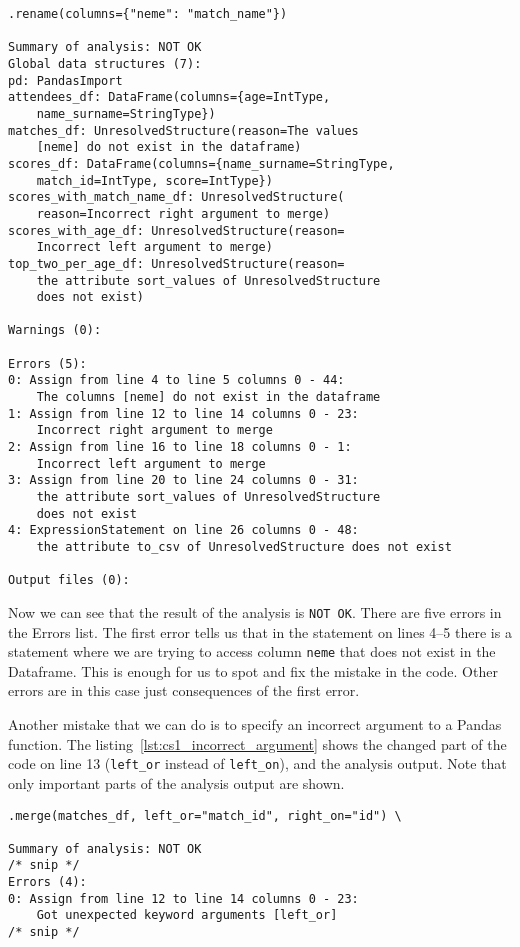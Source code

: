 \begin{lstlisting}[caption=Misspelled column on rename function and analysis output, label={lst:cs1_misspelled_column}, captionpos=b]
    .rename(columns={"neme": "match_name"})

Summary of analysis: NOT OK
Global data structures (7):
pd: PandasImport
attendees_df: DataFrame(columns={age=IntType,
    name_surname=StringType})
matches_df: UnresolvedStructure(reason=The values
    [neme] do not exist in the dataframe)
scores_df: DataFrame(columns={name_surname=StringType,
    match_id=IntType, score=IntType})
scores_with_match_name_df: UnresolvedStructure(
    reason=Incorrect right argument to merge)
scores_with_age_df: UnresolvedStructure(reason=
    Incorrect left argument to merge)
top_two_per_age_df: UnresolvedStructure(reason=
    the attribute sort_values of UnresolvedStructure
    does not exist)

Warnings (0):

Errors (5):
0: Assign from line 4 to line 5 columns 0 - 44:
    The columns [neme] do not exist in the dataframe
1: Assign from line 12 to line 14 columns 0 - 23:
    Incorrect right argument to merge
2: Assign from line 16 to line 18 columns 0 - 1:
    Incorrect left argument to merge
3: Assign from line 20 to line 24 columns 0 - 31:
    the attribute sort_values of UnresolvedStructure
    does not exist
4: ExpressionStatement on line 26 columns 0 - 48:
    the attribute to_csv of UnresolvedStructure does not exist

Output files (0):
\end{lstlisting}

Now we can see that the result of the analysis is \verb|NOT OK|.
There are five errors in the Errors list.
The first error tells us that in the statement on lines 4--5 there is a statement where we are trying to access column
\verb|neme| that does not exist in the Dataframe.
This is enough for us to spot and fix the mistake in the code.
Other errors are in this case just consequences of the first error.

Another mistake that we can do is to specify an incorrect argument to a Pandas function.
The listing~\ref{lst:cs1_incorrect_argument} shows the changed part of the code on line 13 (\verb|left_or| instead of
\verb|left_on|), and the analysis output.
Note that only important parts of the analysis output are shown.

\begin{lstlisting}[caption=Incorrectly specified argument and analysis output, label={lst:cs1_incorrect_argument}, captionpos=b]
    .merge(matches_df, left_or="match_id", right_on="id") \

Summary of analysis: NOT OK
/* snip */
Errors (4):
0: Assign from line 12 to line 14 columns 0 - 23:
    Got unexpected keyword arguments [left_or]
/* snip */
\end{lstlisting}

